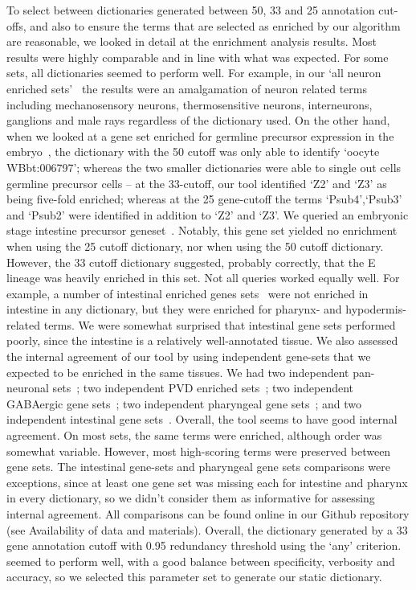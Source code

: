 \documentclass[linenumbers, doublespacing]{bmcart}
\begin{document}
	To select between dictionaries generated between 50, 33 and 25 annotation cut-offs, and also to ensure the terms that are selected as enriched by our algorithm are reasonable, we looked in detail at the enrichment analysis results. 
	Most results were highly comparable and in line with what was expected. For some sets, all dictionaries seemed to perform well. For example, in our `all neuron enriched sets'~\cite{Spencer2011, Watson2008a} the results were an amalgamation of neuron related terms including mechanosensory neurons, thermosensitive neurons, interneurons, ganglions and male rays regardless of the dictionary used. On the other hand, when we looked at a gene set enriched for germline precursor expression in the embryo~\cite{Spencer2011}, the dictionary with the 50 cutoff was only able to identify `oocyte WBbt:006797'; whereas the two smaller dictionaries were able to single out cells germline precursor cells -- at the 33-cutoff, our tool identified `Z2' and `Z3' as being five-fold enriched; whereas at the 25 gene-cutoff the terms `Psub4',`Psub3' and `Psub2' were identified in addition to `Z2' and `Z3'.
	We queried an embryonic stage intestine precursor geneset~\cite{Spencer2011}. Notably, this gene set yielded no enrichment when using the 25 cutoff dictionary, nor when using the 50 cutoff dictionary. However, the 33 cutoff dictionary suggested, probably correctly, that the E lineage was heavily enriched in this set. 
	Not all queries worked equally well. For example, a number of intestinal enriched genes sets~\cite{Spencer2011, Pauli2006} were not enriched in intestine in any dictionary, but they were enriched for pharynx- and hypodermis-related terms. We were somewhat surprised that intestinal gene sets performed poorly, since the intestine is a relatively well-annotated tissue.
	We also assessed the internal agreement of our tool by using independent gene-sets that we expected to be enriched in the same tissues. We had two independent pan-neuronal sets~\cite{Spencer2011, Watson2008a}; two independent PVD enriched sets~\cite{Spencer2011, Smith2010}; two independent GABAergic gene sets~\cite{Spencer2011, Cinar2005}; two independent pharyngeal gene sets~\cite{Spencer2011, Gaudet2004a}; and two independent intestinal gene sets~\cite{Spencer2011, Pauli2006}. Overall, the tool seems to have good internal agreement. On most sets, the same terms were enriched, although order was somewhat variable. However, most high-scoring terms were preserved between gene sets. The intestinal gene-sets and pharyngeal gene sets comparisons were exceptions, since at least one gene set was missing each for intestine and pharynx in every dictionary, so we didn't consider them as informative for assessing internal agreement. 
	 All comparisons can be found online in our Github repository (see Availability of data and materials). Overall, the dictionary generated by a 33 gene annotation cutoff with 0.95 redundancy threshold using the `any' criterion. seemed to perform well, with a good balance between specificity, verbosity and accuracy, so we selected this parameter set to generate our static dictionary. 
	
\end{document}

